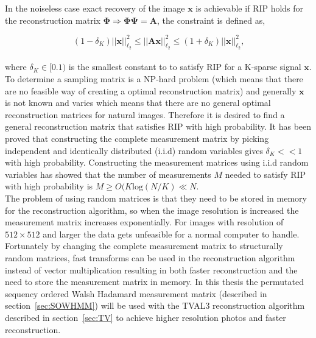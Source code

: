 In the noiseless case exact recovery of the image $\mathbf{x}$ is achievable if RIP holds for the reconstruction matrix $\mathbf{\Phi} \Rightarrow \mathbf{\Phi\Psi = A}$, the constraint is defined as,

\begin{equation}
    (1-\delta_K)||\mathbf{x}||_{\ell_2}^2\leq||\mathbf{Ax}||_{\ell_2}^2\leq(1+\delta_K)||\mathbf{x}||_{\ell_2}^2 \text{,}
\end{equation}\\[0.1in]

where $\delta_K \in [0.1)$ is the smallest constant to to satisfy RIP for a K-sparse signal $\mathbf{x}$. To determine a sampling matrix is a NP-hard problem (which means that there are no feasible way of creating a optimal reconstruction matrix) and generally $\textbf{x}$ is not known and varies which means that there are no general optimal reconstruction matrices for natural images. Therefore it is desired to find a general reconstruction matrix that satisfies RIP with high probability. It has been proved that constructing the complete measurement matrix by picking independent and identically distributed (i.i.d) random variables gives $\delta_K << 1$ with high probability. Constructing the measurement matrices using i.i.d random variables has showed that the number of measurements $M$ needed to satisfy RIP with high probability is $M \geq O(K\text{log}(N/K) \ll N$. \cite{book:srr}\\[0.1in]

The problem of using random matrices is that they need to be stored in memory for the reconstruction algorithm, so when the image resolution is increased the measurement matrix increases exponentially. For images with resolution of $512\times 512$ and larger the data gets unfeasible for a normal computer to handle.\\[0.1in]  

Fortunately by changing the complete measurement matrix to structurally random matrices, fast transforms can be used in the reconstruction algorithm instead of vector multiplication resulting in both faster reconstruction and the need to store the measurement matrix in memory. In this thesis the permutated sequency ordered Walsh Hadamard measurement matrix (described in section~\ref{sec:SOWHMM}) will be used with the TVAL3 reconstruction algorithm described in section~\ref{sec:TV} to achieve higher resolution photos and faster reconstruction.   


